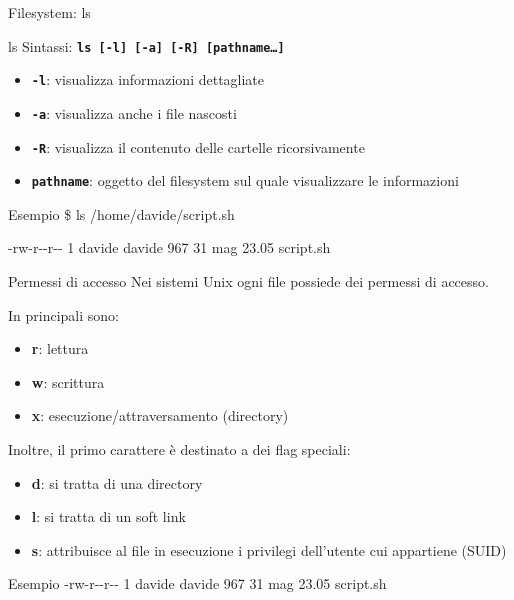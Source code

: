 \documentclass{beamer}
\begin{document}
    \begin{frame}{Filesystem: ls}
        \begin{block}{ls}
            Sintassi: \texttt{\textbf{ls [-l] [-a] [-R] [pathname\dots]}}

            \begin{itemize}
                \item \texttt{\textbf{-l}}: visualizza informazioni dettagliate
                \item \texttt{\textbf{-a}}: visualizza anche i file nascosti
                \item \texttt{\textbf{-R}}: visualizza il contenuto delle cartelle ricorsivamente
                \item \texttt{\textbf{pathname}}: oggetto del filesystem sul quale visualizzare le informazioni
            \end{itemize}
        \end{block}

        \begin{exampleblock}{Esempio}
            \$ ls /home/davide/script.sh
            
            -rw-r-{}-r-{}- 1 davide davide 967 31 mag 23.05 script.sh
        \end{exampleblock}
    \end{frame}

    \begin{frame}{Permessi di accesso}
        Nei sistemi Unix ogni file possiede dei permessi di accesso.

        In principali sono:
        \begin{itemize}
            \item \textbf{r}: lettura
            \item \textbf{w}: scrittura
            \item \textbf{x}: esecuzione/attraversamento (directory)
        \end{itemize}

        \vspace{0.5cm}

        Inoltre, il primo carattere è destinato a dei flag speciali:
        \begin{itemize}
            \item \textbf{d}: si tratta di una directory
            \item \textbf{l}: si tratta di un soft link
            \item \textbf{s}: attribuisce al file in esecuzione i privilegi dell'utente cui appartiene (SUID)
        \end{itemize}

        \begin{exampleblock}{Esempio}
            -rw-r-{}-r-{}- 1 davide davide 967 31 mag 23.05 script.sh
        \end{exampleblock}
    \end{frame}
\end{document}
